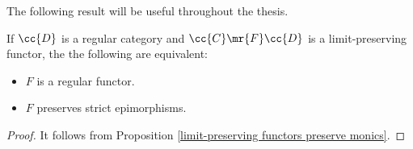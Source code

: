 The following result will be useful throughout the thesis.
\begin{proposition}
If  $\cc{D}$ is a regular category and $\cc{C} \mr{F} \cc{D}$ is  a limit-preserving functor, the the following are equivalent:

\begin{itemize}
\item  $F$ is a regular functor.
\item  $F$ preserves strict epimorphisms.
\end{itemize}

\end{proposition}

\begin{proof}
It follows from Proposition \ref{limit-preserving functors preserve monics}.
\end{proof}

